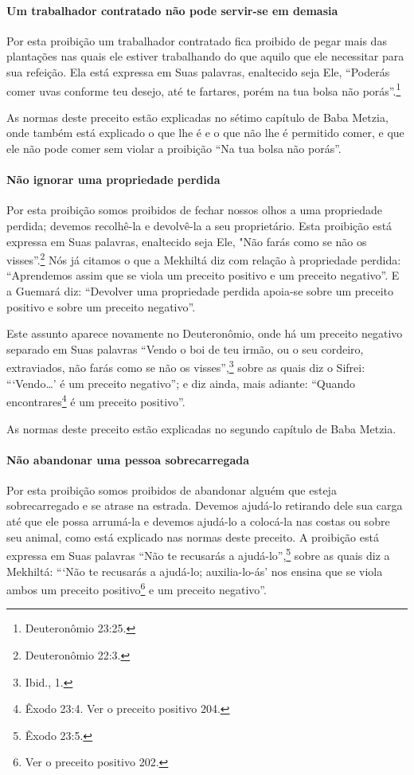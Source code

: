 \paragraph{Um trabalhador contratado não pode servir-se em demasia}

Por esta proibição um trabalhador contratado fica proibido de pegar
mais das plantações nas quais ele estiver trabalhando do que aquilo que
ele necessitar para sua refeição. Ela está expressa em Suas palavras,
enaltecido seja Ele, ``Poderás comer uvas conforme teu desejo, até te
fartares, porém na tua bolsa não porás''.\footnote{Deuteronômio 23:25.}

As normas deste preceito estão explicadas no sétimo capítulo de Baba
Metzia, onde também está explicado o que lhe é e o que não lhe é
permitido comer, e que ele não pode comer sem violar a proibição ``Na
tua bolsa não porás''.

\paragraph{Não ignorar uma propriedade perdida}

Por esta proibição somos proibidos de fechar nossos olhos a uma
propriedade perdida; devemos recolhê-la e devolvê-la a seu proprietário.
Esta proibição está expressa em Suas palavras, enaltecido seja Ele, "Não
farás como se não os visses''.\footnote{Deuteronômio 22:3.} Nós já citamos o que
a Mekhiltá diz com relação à propriedade perdida: ``Aprendemos assim que
se viola um preceito positivo e um preceito negativo''. E a Guemará diz:
``Devolver uma propriedade perdida apoia-se sobre um preceito positivo e
sobre um preceito negativo''.

Este assunto aparece novamente no Deuteronômio, onde há um preceito
negativo separado em Suas palavras ``Vendo o boi de teu irmão, ou o seu
cordeiro, extraviados, não farás como se não os visses'',\footnote{Ibid., 1.}
sobre as quais diz o Sifrei: ```Vendo\ldots{}' é um preceito negativo''; e
diz ainda, mais adiante: ``Quando encontrares\footnote{Êxodo
23:4. Ver o preceito positivo 204.} é um preceito positivo''.

As normas deste preceito estão explicadas no segundo capítulo de Baba Metzia.

\paragraph{Não abandonar uma pessoa sobrecarregada}

Por esta proibição somos proibidos de abandonar alguém que esteja
sobrecarregado e se atrase na estrada. Devemos ajudá-lo retirando dele
sua carga até que ele possa arrumá-la e devemos ajudá-lo a colocá-la nas
costas ou sobre seu animal, como está explicado nas normas deste
preceito. A proibição está expressa em Suas palavras ``Não te recusarás
a ajudá-lo'',\footnote{Êxodo 23:5.} sobre as quais diz a Mekhiltá: ```Não te recusarás a ajudá-lo;
auxilia-lo-ás' nos ensina que se viola ambos um preceito
positivo\footnote{Ver o preceito positivo 202.} e um preceito negativo''.

